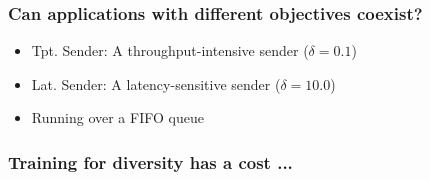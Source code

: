 \begin{frame}
\frametitle{Can applications with different objectives coexist?}
\begin{itemize}
\item Tpt. Sender: A throughput-intensive sender ($\delta=0.1$)
\item Lat. Sender: A latency-sensitive sender ($\delta=10.0$)
\item Running over a FIFO queue
\end{itemize}
\end{frame}

\begin{frame}
\frametitle{Training for diversity has a cost ...}
\begin{centering}

\noindent
{}

\end{centering}
\end{frame}


